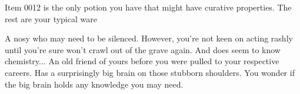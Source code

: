\documentclass[char]{Pestilence}
\begin{document}
\begin{itemz}[Notes]
	\item Item 0012 is the only potion you have that might have curative properties. The rest are your typical ware
\end{itemz}

\begin{contacts}
	\contact{\cOutsider{}} A nosy \cOutsider{\human} who may need to be silenced. However, you're not keen on acting rashly until you're sure \cOutsider{\they} won't crawl out of the grave again. And \cOutsider{\they} does seem to know \cOutsider{\their} chemistry...
	\contact{\cApprentice{}} An old friend of yours before you were pulled to your respective careers. Has a surprisingly big brain on those stubborn shoulders. You wonder if the big brain holds any knowledge you may need.
\end{contacts}
\end{document}
